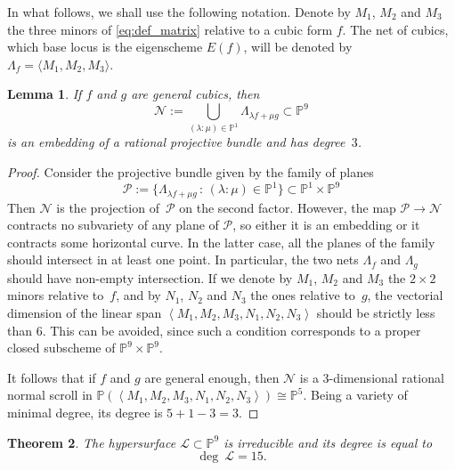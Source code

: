 \documentclass{amsart}
\theoremstyle{plain}
\newtheorem{theorem}{Theorem}[section]
\newtheorem{lem}[theorem]{Lemma}
\theoremstyle{definition}
\newcommand{\p}{\mathbb{P}}
\newcommand{\sL}{\mathcal{L}}
\begin{document}
In what follows, we shall use the following notation.
Denote by $M_1$, $M_2$ and $M_3$ the three minors of \ref{eq:def_matrix} relative to a cubic form $f$.
The net of cubics, which base locus is the eigenscheme $E(f)$, will be denoted by $\Lambda_f = \langle M_1, M_2, M_3 \rangle$. 
\begin{lem}
\label{lem:scroll}
 If $f$ and $g$ are general cubics, then
 \[
   \mathcal{N} := \bigcup_{(\lambda : \mu) \in \p^1} \Lambda_{\lambda f + \mu g} \subset \p^9
 \]
 is an embedding of a rational projective bundle and has degree~$3$.
\end{lem}
\begin{proof}
Consider the projective bundle given by the family of planes
%
\[
{\mathcal P} := \{ \Lambda_{\lambda f + \mu g} \, : \, (\lambda: \mu)\in \p^1 \} \subset \p^1 \times \p^9
\]
%
Then $\mathcal{N}$ is the projection of~$\mathcal{P}$ on the second factor.
However, the map ${\mathcal P} \to {\mathcal N}$ contracts no subvariety of any plane of ${\mathcal P}$, so either it is an embedding or it contracts some horizontal curve. In the latter case, all the planes of the family should intersect in at least one point. In particular, the two nets $\Lambda_f$ and $\Lambda_g$ should have non-empty intersection.
If we denote by $M_1$, $M_2$ and $M_3$ the $2 \times 2$ minors relative to~$f$, and by $N_1$, $N_2$ and $N_3$ the ones relative to~$g$, the vectorial dimension of the linear span $\left\langle M_1, M_2, M_3, N_1, N_2, N_3 \right\rangle$ should be strictly less than $6$. This can be avoided, since such a condition corresponds to a proper closed subscheme of $\p^9 \times \p^9$.

It follows that if $f$ and $g$ are general enough, then $\mathcal{N}$ is a $3$-dimensional rational normal scroll in $\p(\left\langle M_1, M_2, M_3, N_1, N_2, N_3 \right\rangle) \cong \p^5$. 
Being a variety of minimal degree, its degree is $5+1-3 = 3$.
\end{proof}

\begin{theorem} The hypersurface $\sL \subset \p^9$ is irreducible and its degree is equal to
\[
  \deg \ \mathcal L =  15.
\]
\end{theorem}
\end{document}
